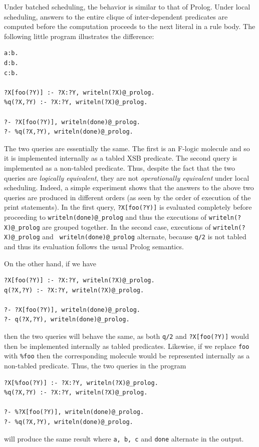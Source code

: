 \documentclass[11pt]{article}
\newcommand{\fl}{\mbox{F-logic}\xspace}
\begin{document}
Under batched scheduling, the behavior is similar to that of Prolog.
Under local scheduling, answers to the entire clique of inter-dependent
predicates are computed before the computation proceeds to the next literal
in a rule body. The following little program illustrates the difference:
\begin{verbatim}
a:b.
d:b.
c:b.

?X[foo(?Y)] :- ?X:?Y, writeln(?X)@_prolog.
%q(?X,?Y) :- ?X:?Y, writeln(?X)@_prolog.

?- ?X[foo(?Y)], writeln(done)@_prolog.
?- %q(?X,?Y), writeln(done)@_prolog.
\end{verbatim}
The two queries are essentially the same. The first is an \fl molecule
and so it is implemented internally as a tabled XSB predicate. The
second query is implemented as a non-tabled predicate.  Thus, despite
the fact that the two queries are \emph{logically equivalent}, they are
not \emph{operationally equivalent} under local scheduling.  Indeed, a
simple experiment shows that the answers to the above two queries are
produced in different orders (as seen by the order of execution of the
print statements).  In the first query, \verb|?X[foo(?Y)]| is evaluated
completely before proceeding to {\tt writeln(done)@\_prolog} and thus
the executions of {\tt writeln(?X)@\_prolog} are grouped together. In the
second case, executions of {\tt writeln(?X)@\_prolog} and {\tt
writeln(done)@\_prolog} alternate, because {\tt \verb|q|/2} is not tabled
and thus its evaluation follows the usual Prolog semantics.

On the other hand, if we have
\begin{verbatim}
?X[foo(?Y)] :- ?X:?Y, writeln(?X)@_prolog.
q(?X,?Y) :- ?X:?Y, writeln(?X)@_prolog.

?- ?X[foo(?Y)], writeln(done)@_prolog.
?- q(?X,?Y), writeln(done)@_prolog.
\end{verbatim}
then the two queries will behave the same, as both {\tt q/2} and
\verb|?X[foo(?Y)]| would then be implemented internally as tabled predicates.
Likewise, if we replace {\tt foo} with {\tt \%foo} then the corresponding
molecule would be represented internally as a non-tabled predicate.
Thus, the two queries in the program
\begin{verbatim}
?X[%foo(?Y)] :- ?X:?Y, writeln(?X)@_prolog.
%q(?X,?Y) :- ?X:?Y, writeln(?X)@_prolog.

?- %?X[foo(?Y)], writeln(done)@_prolog.
?- %q(?X,?Y), writeln(done)@_prolog.
\end{verbatim}
will produce the same result where {\tt a, b, c} and {\tt done}
alternate in the output.
\end{document}
